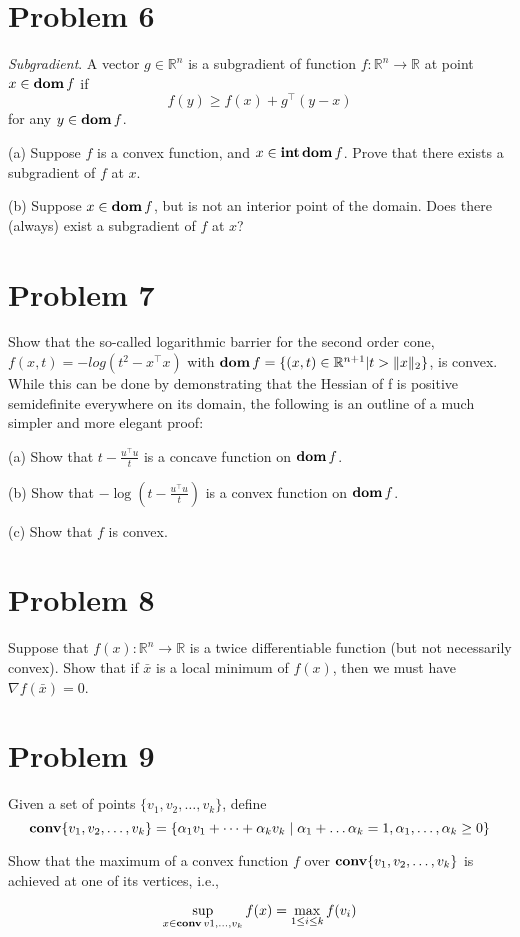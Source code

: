 \documentclass[11pt]{article}
\newcommand{\grad}{\nabla}
\newcommand{\RR}{\mathbb{R}}
\newcommand{\T}{^\top}
\begin{document}
\clearpage
\section*{Problem 6}
\textit{Subgradient}. A vector $g\in \RR^n$ is a subgradient of function $f:\RR^n \rightarrow \RR$ at point $x\in\mathop{\textbf{dom}} f$ if
\[
f(y) \geq f(x) + g\T (y-x)
\] 
for any $y\in\mathop{\textbf{dom}} f$.

(a) Suppose $f$ is a convex function, and $x\in\mathop{\textbf{int}}\mathop{\textbf{dom}} f$. Prove that there exists a subgradient of $f$ at $x$.

(b) Suppose $x\in\mathop{\textbf{dom}} f$, but is not an interior point of the domain. Does there (always) exist a subgradient of $f$ at $x$?


\clearpage
\section*{Problem 7}
Show that the so-called logarithmic barrier for the second order cone, $f(x, t) = -log(t^2 - x\T x)$ with $\dom f = \{(x,t) \in \RR^{n+1} | t>\|x\|_2\}$, is convex.
While this can be done by demonstrating that the Hessian of f is positive semidefinite everywhere on its domain, the following is an outline of a much simpler and more elegant proof:

(a) Show that $t-\frac{u\T u}{t}$ is a concave function on $\mathop{\textbf{dom}} f$.

(b) Show that $-\log (t - \frac{u\T u}{t})$ is a convex function on $\mathop{\textbf{dom}} f$.

(c) Show that $f$ is convex.


\clearpage
\section*{Problem 8}
Suppose that $f(x): \RR^n \rightarrow \RR$ is a twice differentiable function (but not necessarily convex). Show that if $\bar x$ is a local minimum of $f(x)$, then we must have $\grad f(\bar x) = 0$.

\clearpage
\section*{Problem 9}
Given a set of points $\{v_1, v_2, \dots, v_k\}$, define
\[
\mathop {\textbf{conv}}\{v_1, v_2, \dots, v_k\} = \{\alpha_1 v_1 + \dots + \alpha_k v_k\mid \alpha_1 + \dots \alpha_k = 1, \alpha_1, \dots, \alpha_k \geq 0\}
\]

Show that the maximum of a convex function $f$ over $\mathop {\textbf{conv}}\{v_1, v_2, \dots, v_k\}$ is achieved at one of its vertices, i.e.,

\[
\sup_{x\in\mathop {\textbf{conv}}{v1, \dots, v_k}} f(x) = \max_{1\leq i \leq k} f(v_i)
\]
\end{document}
